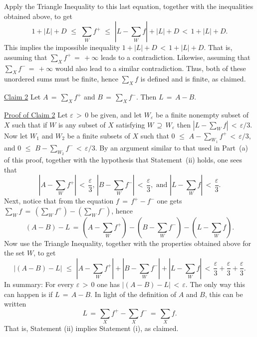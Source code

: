     Apply the Triangle Inequality to this last equation, together with the inequalities obtained above, to get
        \begin{displaymath}
        1+|L| + D\,\,{\leq}\,\,{\sum}_{W} f^{+}\,\,{\leq}\,\,\left|L-{\sum}_{W} f\right| + |L| + D\,<\,1 + |L| + D.
        \end{displaymath}
    This implies the impossible inequality $1+|L|+D\,<\,1+|L|+D$.
    That is, assuming that ${\sum}_{X} f^{+} \,=\, +{\infty}$ leads to a contradiction.
    Likewise, assuming that ${\sum}_{X} f^{-} \,=\, +{\infty}$ would also lead to a similar contradiction.
    Thus, both of these unordered sums must be finite, hence ${\sum}_{X} f$ is defined and is finite, as claimed.

        \underline{Claim 2} Let $A \,=\, {\sum}_{X} f^{+}$ and $B \,=\, {\sum}_{X} f^{-}$.
    Then $L \,=\, A-B$.

        \underline{Proof of Claim 2} Let ${\varepsilon}\,>\,0$ be given, and let $W_{{\varepsilon}}$ be a finite nonempty subset of $X$ such that
    if $W$ is any subset of $X$ satisfying $W \,{\supseteq}\, W_{{\varepsilon}}$ then $|L-{\sum}_{W} f|\,<\,{\varepsilon}/3$.
    Now let $W_{1}$ and $W_{2}$ be a finite subsets of $X$ such that $0\,\,{\leq}\,\,A-{\sum}_{W_{1}} f^{+}\,<\,{\varepsilon}/3$,
    and $0\,\,{\leq}\,\,B-{\sum}_{W_{2}} f^{-}\,<\,{\varepsilon}/3$.
    By an argument similar to that used in Part~(a) of this proof, together with the hypothesis that Statement~(ii) holds, one sees that
        \begin{displaymath}
        |A-{\sum}_{W} f^{+}|\,<\,\frac{{\varepsilon}}{3}, \,
        |B-{\sum}_{W} f^{-}|\,<\,\frac{{\varepsilon}}{3}, \mbox{ and }
        |L-{\sum}_{W} f|\,<\,\frac{{\varepsilon}}{3}.
        \end{displaymath}
    Next, notice that from the equation $f \,=\, f^{+} - f^{-}$ one gets ${\displaystyle \sum_{W} f \,=\, \left(\sum_{W} f^{+}\right) - \left(\sum_{W} f^{-}\right)}$, hence
        \begin{displaymath}
        (A-B)-L \,=\, \left(A-{\sum}_{W} f^{+}\right) - \left(B- {\sum}_{W} f^{-}\right) - \left(L-{\sum}_{W} f\right).
        \end{displaymath}
    Now use the Triangle Inequality, together with the properties obtained above for the set $W$, to get
        \begin{displaymath}
        |(A-B)-L|\,\,{\leq}\,\,\left|A-{\sum}_{W} f^{+}\right| + \left|B- {\sum}_{W} f^{-}\right| + \left|L-{\sum}_{W} f\right|\,<\,
    \frac{{\varepsilon}}{3} + \frac{{\varepsilon}}{3} + \frac{{\varepsilon}}{3}.
        \end{displaymath}
    In summary: For every ${\varepsilon}\,>\,0$ one has $|(A-B)-L|\,<\,{\varepsilon}$.
    The only way this can happen is if $L \,=\, A-B$.
    In light of the definition of $A$ and $B$, this can be written
        \begin{displaymath}
        L \,=\, {\sum}_{X} f^{+} - {\sum}_{X} f^{-} \,=\, {\sum}_{X} f.
        \end{displaymath}
    That is, Statement (ii) implies Statement (i), as claimed.

